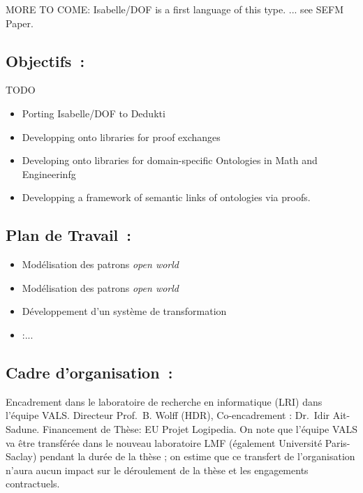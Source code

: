 \documentclass[a4paper,10pt]{article}
\begin{document}
MORE TO COME: Isabelle/DOF is a first language of this type. 
... see SEFM Paper. 

\subsection*{Objectifs~:}

TODO

\begin{itemize}
\item
  Porting Isabelle/DOF to Dedukti
\item
  Developping onto libraries for proof exchanges
\item
  Developing onto libraries for domain-specific Ontologies in Math and Engineerinfg
\item
  Developping a framework of semantic links of ontologies via proofs.
\end{itemize}

\subsection*{Plan de Travail~:}
\begin{itemize}
  \item
    Modélisation des patrons \emph{open world}
  \item
    Modélisation des patrons \emph{open world}
  \item
    Développement d'un système de transformation
  \item :...
\end{itemize}

\subsection*{Cadre d'organisation~:}
Encadrement dans le laboratoire de recherche en informatique (LRI)
dans l'équipe VALS\@.
Directeur Prof.\ B. Wolff (HDR), Co-encadrement : Dr.\ Idir Ait-Sadune.
Financement de Thèse: EU Projet Logipedia.
On note que l'équipe VALS va être transférée
dans le nouveau laboratoire LMF (également Université Paris-Saclay)
pendant la durée de la thèse ;
on estime que ce transfert de l'organisation n'aura aucun impact
sur le déroulement de la thèse et les engagements contractuels.



\end{document}
